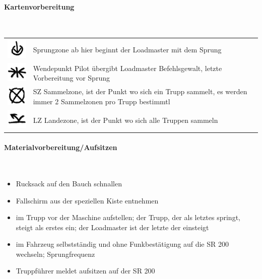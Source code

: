 \paragraph{Kartenvorbereitung} \ \\
\begin{tabular}{p{3cm} p{15cm}}
	\includegraphics[scale=1]{./Grafiken/KarteUndMarkierungen/Endpunkt.png}		&		Sprungzone ab hier beginnt der Loadmaster mit dem Sprung\\
	\includegraphics[scale=1]{./Grafiken/KarteUndMarkierungen/Treffpunkt.png} 		&		Wendepunkt Pilot übergibt Loadmaster Befehlsgewalt, letzte Vorbereitung vor Sprung\\
	\includegraphics[scale=1]{./Grafiken/KarteUndMarkierungen/Aufgabe.png}		&		SZ Sammelzone, ist der Punkt wo sich ein Trupp sammelt, es werden immer 2 Sammelzonen pro Trupp bestimmtl \\
	\includegraphics[scale=1]{./Grafiken/KarteUndMarkierungen/LZ.png}			&		LZ Landezone, ist der Punkt wo sich alle Truppen sammeln \\
\end{tabular}

\paragraph{Materialvorbereitung/Aufsitzen}  \ \\

	\begin{itemize}
		\item Rucksack auf den Bauch schnallen 
		\item  Fallschirm aus der speziellen Kiste entnehmen
		\item  im Trupp vor der Maschine aufstellen; der Trupp, der als letztes springt, steigt als erstes ein; der Loadmaster ist der letzte der einsteigt
		\item im Fahrzeug selbstständig und ohne Funkbestätigung auf die SR 200 wechseln; Sprungfrequenz
		\item  Truppführer meldet aufsitzen auf der SR 200
	\end{itemize}

